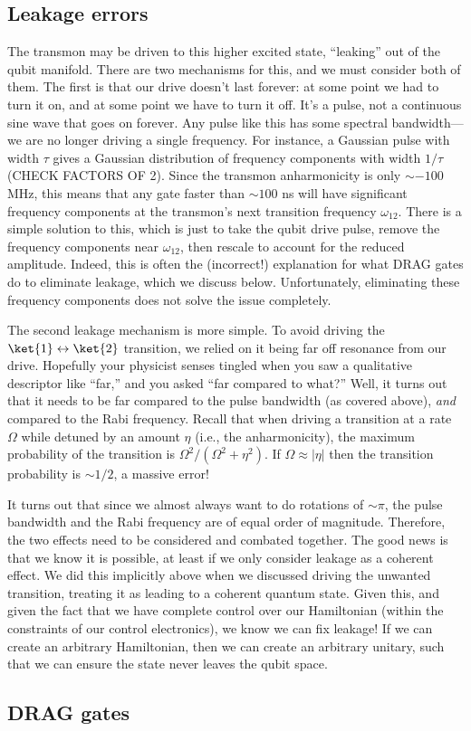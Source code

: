 \subsection{Leakage errors}
The transmon may be driven to this higher excited state, ``leaking'' out of the qubit manifold. There are two mechanisms for this, and we must consider both of them. The first is that our drive doesn't last forever: at some point we had to turn it on, and at some point we have to turn it off. It's a pulse, not a continuous sine wave that goes on forever. Any pulse like this has some spectral bandwidth---we are no longer driving a single frequency. For instance, a Gaussian pulse with width $\tau$ gives a Gaussian distribution of frequency components with width $1/\tau$ (CHECK FACTORS OF 2). Since the transmon anharmonicity is only $\sim -100$ MHz, this means that any gate faster than $\sim 100$ ns will have significant frequency components at the transmon's next transition frequency $\omega_{12}$. There is a simple solution to this, which is just to take the qubit drive pulse, remove the frequency components near $\omega_{12}$, then rescale to account for the reduced amplitude. Indeed, this is often the (incorrect!) explanation for what DRAG gates do to eliminate leakage, which we discuss below. Unfortunately, eliminating these frequency components does not solve the issue completely.

The second leakage mechanism is more simple. To avoid driving the $\ket{1}\leftrightarrow\ket{2}$ transition, we relied on it being far off resonance from our drive. Hopefully your physicist senses tingled when you saw a qualitative descriptor like ``far,'' and you asked ``far compared to what?'' Well, it turns out that it needs to be far compared to the pulse bandwidth (as covered above), \textit{and} compared to the Rabi frequency. Recall that when driving a transition at a rate $\Omega$ while detuned by an amount $\eta$ (i.e., the anharmonicity), the maximum probability of the transition is $\Omega^2/(\Omega^2+\eta^2)$. If $\Omega\approx |\eta|$ then the transition probability is $\sim 1/2$, a massive error!

It turns out that since we almost always want to do rotations of $\sim\pi$, the pulse bandwidth and the Rabi frequency are of equal order of magnitude. Therefore, the two effects need to be considered and combated together. The good news is that we know it is possible, at least if we only consider leakage as a coherent effect. We did this implicitly above when we discussed driving the unwanted transition, treating it as leading to a coherent quantum state. Given this, and given the fact that we have complete control over our Hamiltonian (within the constraints of our control electronics), we know we can fix leakage! If we can create an arbitrary Hamiltonian, then we can create an arbitrary unitary, such that we can ensure the state never leaves the qubit space. 

\subsection{DRAG gates}

\label{sec:DRAG}
